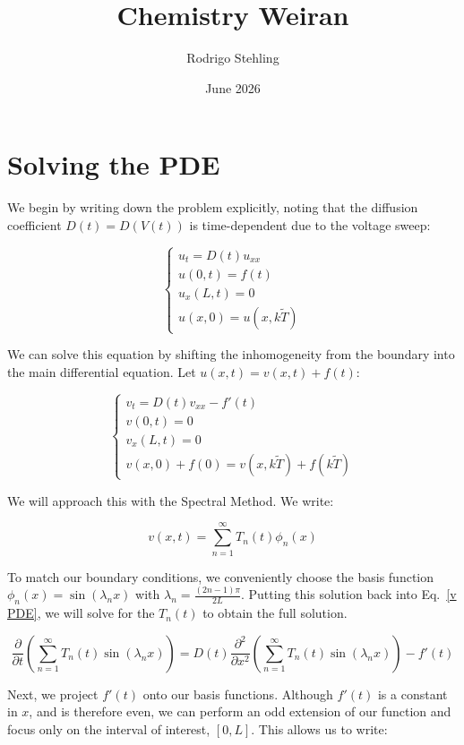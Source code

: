 \documentclass{article}
\title{Chemistry Weiran}
\author{Rodrigo Stehling}
\date{June 2026}
\begin{document}
\section{Solving the PDE}

We begin by writing down the problem explicitly, noting that the diffusion coefficient $D(t) = D(V(t))$ is time-dependent due to the voltage sweep:

\begin{equation}
    \begin{cases}
        u_t = D(t)u_{xx}\\
        u(0,t) = f(t)\\
        u_x(L,t) = 0\\
        u(x,0) = u(x,k\tilde{T})
    \end{cases}
\end{equation}

We can solve this equation by shifting the inhomogeneity from the boundary into the main differential equation. Let $u(x,t) = v(x,t) + f(t)$:

\begin{equation}
    \label{v PDE}
    \begin{cases}
        v_t = D(t)v_{xx} - f'(t)\\
        v(0,t) = 0\\
        v_x(L,t) = 0\\
        v(x,0) + f(0) = v(x,k\tilde{T}) + f(k\tilde{T})
    \end{cases}
\end{equation}

We will approach this with the Spectral Method. We write:

\begin{equation}
    v(x,t) = \sum_{n=1}^\infty T_n(t)\phi_n(x)
\end{equation}

To match our boundary conditions, we conveniently choose the basis function $\phi_n(x) = \sin(\lambda_n x)$ with $\lambda_n = \frac{(2n-1)\pi}{2L}$. Putting this solution back into Eq.~\ref{v PDE}, we will solve for the $T_n(t)$ to obtain the full solution.

\begin{equation}
    \label{not projected}
    \frac{\partial}{\partial t}\left(\sum_{n=1}^\infty T_n(t)\sin(\lambda_n x)\right) = D(t)\frac{\partial^2}{\partial x^2}\left(\sum_{n=1}^\infty T_n(t)\sin(\lambda_nx)\right) - f'(t)
\end{equation}

Next, we project $f'(t)$ onto our basis functions. Although $f'(t)$ is a constant in $x$, and is therefore even, we can perform an odd extension of our function and focus only on the interval of interest, $[0,L]$. This allows us to write:
\end{document}
